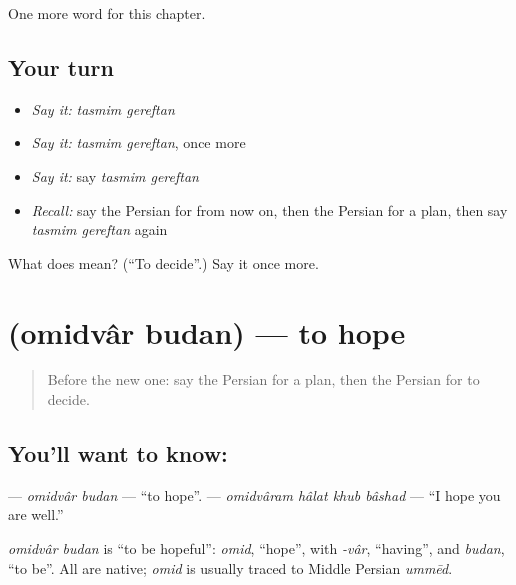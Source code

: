 \begin{grammarlens}[title={What you've built}]
One more word for this chapter.
\end{grammarlens}

\subsection*{Your turn}
\begin{itemize}
\raggedright
  \item \emph{Say it:} \emph{tasmim gereftan}
  \item \emph{Say it:} \emph{tasmim gereftan}, once more
  \item \emph{Say it:} say \emph{tasmim gereftan}
  \item \emph{Recall:} say the Persian for from now on, then the Persian for a plan, then say \emph{tasmim gereftan} again
\end{itemize}

\begin{tcolorbox}[breakable,colback=teal!4,colframe=teal!35!black,title={Before you move on}]
What does   mean? (\textquotedblleft{}To decide\textquotedblright{}.) Say it once more.
\end{tcolorbox}
\section[\texorpdfstring{\fa{امیدوار} \fa{بودن} (omidvâr budan)}{امیدوار بودن (omidvâr budan)}]{  (omidvâr budan) — to hope}

\label{lesson:FA-C138-omidvar-budan}



\begin{quote}
Before the new one: say the Persian for a plan, then the Persian for to decide.
\end{quote}

\subsection*{You'll want to know:  }
\textbf{ } — \emph{omidvâr budan} — \textquotedblleft{}to hope\textquotedblright{}. \textbf{   } — \emph{omidvâram hâlat khub bâshad} — \textquotedblleft{}I hope you are well.\textquotedblright{}

\begin{cousinweb}
\emph{omidvâr budan} is \textquotedblleft{}to be hopeful\textquotedblright{}: \emph{omid}, \textquotedblleft{}hope\textquotedblright{}, with \emph{-vâr}, \textquotedblleft{}having\textquotedblright{}, and \emph{budan}, \textquotedblleft{}to be\textquotedblright{}. All are native; \emph{omid} is usually traced to Middle Persian \emph{ummēd}.
\end{cousinweb}

